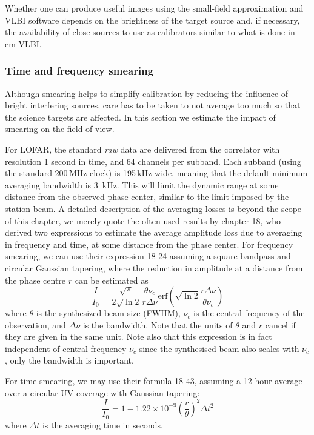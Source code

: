 \documentclass[graybox]{svmult}
\begin{document}
Whether one can produce useful images using the small-field approximation and
VLBI software depends on the brightness of the target source and, if necessary,
the availability of close sources to use as calibrators similar to what is done
in cm-VLBI.

\subsubsection{Time and frequency smearing}
\label{sect:smearing}
Although smearing helps to simplify calibration by reducing the influence of
bright interfering sources, care has to be taken to not average too much so
that the science targets are affected. In this section we estimate the impact
of smearing on the field of view.

For LOFAR, the standard
\emph{raw} data are delivered from the correlator with resolution 1 second in
time, and 64 channels per subband.  Each subband (using the standard 200\,MHz
clock) is 195\,kHz wide, meaning that the default minimum averaging bandwidth
is 3~kHz. This will limit the dynamic range at some distance from the observed
phase center, similar to the limit imposed by the station beam.  A detailed
description of the averaging losses is beyond the scope of this chapter, we
merely quote the often used results by \cite{taylor99} chapter 18, who derived
two expressions to estimate the average amplitude loss due to averaging in
frequency and time, at some distance from the phase center.  For frequency
smearing, we can use their expression 18-24 assuming a square bandpass and
circular Gaussian tapering, where the reduction in amplitude at a distance from
the phase centre $r$ can be estimated as
\begin{equation}
\frac{I}{I_0} = \frac{\sqrt{\pi}}{2\sqrt{\ln{2}}}\frac{\theta \nu_c}{r \Delta
\nu}\mathrm{erf}\left(\sqrt{\ln{2}}\frac{r \Delta\nu}{\theta \nu_c}\right)
\label{eqn:freqloss}
\end{equation}
where $\theta$ is the synthesized beam size (FWHM), $\nu_c$ is the central
frequency of the observation, and $\Delta \nu$ is the bandwidth. Note that the
units of $\theta$ and $r$ cancel if they are given in the same unit. Note also
that this expression is in fact independent of central frequency $\nu_c$ since
the synthesised beam also scales with $\nu_c$, only the bandwidth is important.

For time smearing, we may use their formula 18-43, assuming a 12 hour average
over a circular UV-coverage with Gaussian tapering:
\begin{equation}
\frac{I}{I_0} = 1-1.22\times 10^{-9}\left(\frac{r}{\theta}\right)^2\Delta t^2
\label{eqn:timeloss}
\end{equation}
where $\Delta t$ is the averaging time in seconds.
\end{document}
